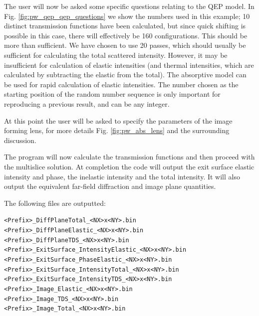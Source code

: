 \documentclass[12pt,a4paper]{article}
\newenvironment{myenv}{\begin{samepage}\begin{adjustwidth}{2cm}{}}{\end{adjustwidth}\end{samepage}}
\begin{document}
The user will now be asked some specific questions relating to the QEP model.
In Fig. \ref{fig:pw_qep_qep_questions} we show the numbers used in this example; 10 distinct transmission functions have been calculated, but since quick shifting is possible in this case, there will effectively be 160 configurations.
This should be more than sufficient.
We have chosen to use 20 passes, which should usually be sufficient for calculating the total scattered intensity.
However, it may be insufficient for calculation of elastic intensities (and thermal intensities, which are calculated by subtracting the elastic from the total).
The absorptive model can be used for rapid calculation of elastic intensities.
The number chosen as the starting position of the random number sequence is only important for reproducing a previous result, and can be any integer.

At this point the user will be asked to specify the parameters of the image forming lens, for more details Fig. \ref{fig:pw_abs_lens} and the surrounding discussion.

The program will now calculate the transmission functions and then proceed with the multislice solution.
At completion the code will output the exit surface elastic intensity and phase, the inelastic intensity and the total intensity. It will also output the equivalent far-field diffraction and image plane quantities. 

The following files are outputted:
%
\begin{myenv}
    \verb|<Prefix>_DiffPlaneTotal_<NX>x<NY>.bin| \\
    \verb|<Prefix>_DiffPlaneElastic_<NX>x<NY>.bin| \\
    \verb|<Prefix>_DiffPlaneTDS_<NX>x<NY>.bin| \\
    \verb|<Prefix>_ExitSurface_IntensityElastic_<NX>x<NY>.bin| \\
    \verb|<Prefix>_ExitSurface_PhaseElastic_<NX>x<NY>.bin| \\
    \verb|<Prefix>_ExitSurface_IntensityTotal_<NX>x<NY>.bin| \\
    \verb|<Prefix>_ExitSurface_IntensityTDS_<NX>x<NY>.bin| \\
    \verb|<Prefix>_Image_Elastic_<NX>x<NY>.bin| \\
    \verb|<Prefix>_Image_TDS_<NX>x<NY>.bin| \\
    \verb|<Prefix>_Image_Total_<NX>x<NY>.bin|
\end{myenv}
\end{document}
